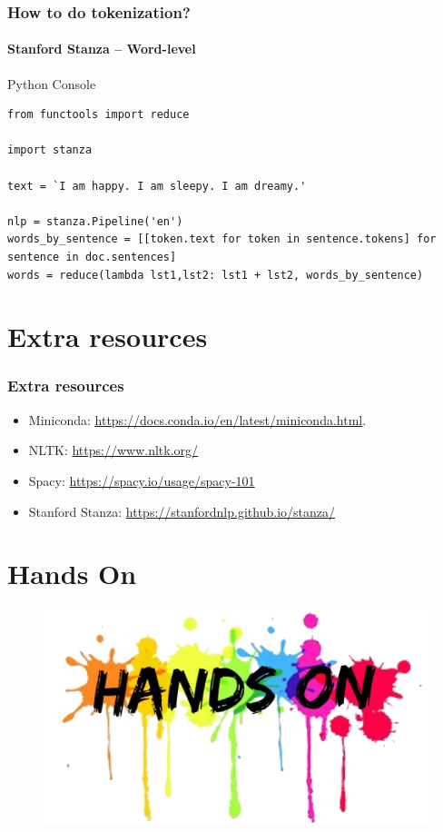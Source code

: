 \documentclass{beamer}
\begin{document}
\begin{frame}[containsverbatim]
    \frametitle{How to do tokenization?}
    \framesubtitle{Stanford Stanza -- Word-level}
    \begin{block}{Python Console}
        \begin{lstlisting}
from functools import reduce

import stanza

text = `I am happy. I am sleepy. I am dreamy.'

nlp = stanza.Pipeline('en')
words_by_sentence = [[token.text for token in sentence.tokens] for sentence in doc.sentences]
words = reduce(lambda lst1,lst2: lst1 + lst2, words_by_sentence)

        \end{lstlisting}    
    \end{block}
\end{frame}

\section{Extra resources}
\begin{frame}
    \frametitle{Extra resources}
    \begin{itemize}
        \item Miniconda: \href{https://docs.conda.io/en/latest/miniconda.html}{https://docs.conda.io/en/latest/miniconda.html}.
        \item NLTK: \href{https://www.nltk.org/}{https://www.nltk.org/}
        \item Spacy: \href{https://spacy.io/usage/spacy-101}{https://spacy.io/usage/spacy-101}
        \item Stanford Stanza: \href{https://stanfordnlp.github.io/stanza/}{https://stanfordnlp.github.io/stanza/}
    \end{itemize}
\end{frame}

\section{Hands On}
\begin{frame}
    \begin{figure}
        \centering
        \includegraphics[scale=0.3]{handson}
    \end{figure}
\end{frame}
\end{document}
